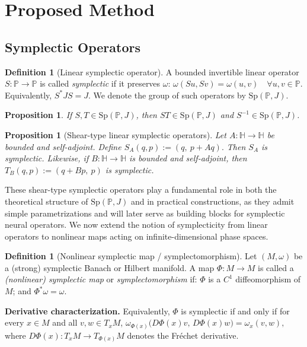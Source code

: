 \documentclass{article}
\theoremstyle{plain}
\newtheorem{proposition}[theorem]{Proposition}
\theoremstyle{definition}
\newtheorem{definition}[theorem]{Definition}
\theoremstyle{remark}
\newcommand{\MEMO}[1]{}
\newcommand{\bbH}{\mathbb{H}}
\newcommand{\bbP}{\mathbb{P}}
\begin{document}
\section{Proposed Method}
\subsection{Symplectic Operators} 
\label{subsec:symplectic-operators}
\begin{definition}[Linear symplectic operator]
A bounded invertible linear operator $S:\bbP\to\bbP$ is called \emph{symplectic} if it preserves $\omega$:
\(
\omega(Su,Sv)=\omega(u,v)\quad \forall u,v\in\bbP.
\)
Equivalently,
\(
S^* J S = J.
\)
We denote the group of such operators by $\mathrm{Sp}(\bbP,J)$.
\end{definition}
\MEMO{We first show the following two important propositions to construct the proposed symplectic neural operators.}
\begin{proposition}
\label{prop:composition-sympl}
If $S,T\in \mathrm{Sp}(\bbP,J)$, then $ST\in \mathrm{Sp}(\bbP,J)$ and $S^{-1}\in \mathrm{Sp}(\bbP,J)$.
\end{proposition}
\begin{proposition}[Shear-type linear symplectic operators]
\label{prop:linear-shear}
Let $A:\bbH\to\bbH$ be bounded and self-adjoint. Define
\(
S_A(q,p):=(q,\ p + Aq).
\)
Then $S_A$ is symplectic. Likewise, if $B:\bbH\to\bbH$ is bounded and self-adjoint, then
\(
T_B(q,p):=(q + Bp,\ p)
\)
is symplectic.
\end{proposition}
These shear-type symplectic operators play a fundamental role in both the
theoretical structure of $\mathrm{Sp}(\bbP,J)$ and in practical constructions,
as they admit simple parametrizations and will later serve as building blocks
for symplectic neural operators.
We now extend the notion of symplecticity from linear operators to nonlinear maps
acting on infinite-dimensional phase spaces.
\begin{definition}[Nonlinear symplectic map / symplectomorphism]
Let $(M,\omega)$ be a (strong) symplectic Banach or Hilbert manifold.
A map
\(
\Phi : M \to M
\)
is called a \emph{(nonlinear) symplectic map} or \emph{symplectomorphism} if: $\Phi$ is a $C^1$ diffeomorphism of $M$;
and 
\(
\Phi^*\omega = \omega.
\)
\end{definition}
\textbf{Derivative characterization.}
Equivalently, $\Phi$ is symplectic if and only if for every $x\in M$ and all
$v,w\in T_xM$,
\(
\omega_{\Phi(x)}\big(D\Phi(x)v,\, D\Phi(x)w\big)
=
\omega_x(v,w),
\)
where $D\Phi(x):T_xM\to T_{\Phi(x)}M$ denotes the Fréchet derivative.\\
\end{document}
